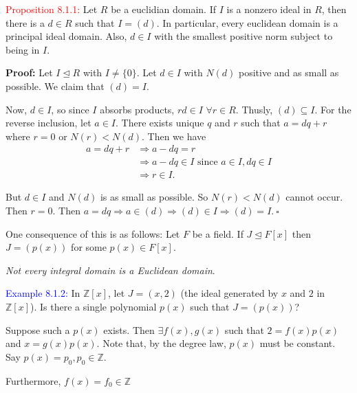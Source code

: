 \documentclass{article}
\begin{document}
\textcolor{red}{Proposition 8.1.1:} Let $R$ be a euclidian domain. If $I$ is a nonzero ideal in $R$, then there is a $d \in R$ such that 
$I=(d)$. In particular, every euclidean domain is a principal ideal domain. Also, $d \in I$ with the smallest positive norm subject to 
being in $I$.

\textbf{Proof:} Let $I \trianglelefteq R$ with $I \neq \{0\}$. Let $d \in I$ with $N(d)$ positive and as small as possible. We claim that 
$(d)=I$.

Now, $d \in I$, so since $I$ absorbs products, $rd \in I$ $\forall r \in R$. Thusly, $(d) \subseteq I$. For the reverse inclusion, let 
$a \in I$. There exists unique $q$ and $r$ such that $a=dq+r$ where $r = 0$ or $N(r) < N(d)$. Then we have
\begin{align*}
    a = dq+r &\Longrightarrow a-dq = r \\
    &\Longrightarrow a-dq \in I \text{ since } a \in I, dq \in I \\
    &\Longrightarrow r \in I.
\end{align*}

But $d \in I$ and $N(d)$ is as small as possible. So $N(r) < N(d)$ cannot occur. Then $r = 0$. Then 
$a=dq \Longrightarrow a \in (d) \Longrightarrow (d) \in I \Longrightarrow (d)=I. \ \square$

One consequence of this is as follows: Let $F$ be a field. If $J \trianglelefteq F[x]$ then $J=(p(x))$ for some $p(x) \in F[x]$. 

\textit{Not every integral domain is a Euclidean domain}.

\textcolor{blue}{Example 8.1.2:} In $\mathbb{Z}[x]$, let $J = (x,2)$ (the ideal generated by $x$ and $2$ in $\mathbb{Z}[x]$). Is 
there a single polynomial $p(x)$ such that $J=(p(x))$?

Suppose such a $p(x)$ exists. Then $\exists f(x),g(x)$ such that $2 = f(x)p(x)$ and $x = g(x)p(x)$. Note that, by the degree law,
$p(x)$ must be constant. Say $p(x) = p_0, p_0 \in \mathbb{Z}$.

Furthermore, $f(x)=f_0 \in \mathbb{Z}$
\end{document}
